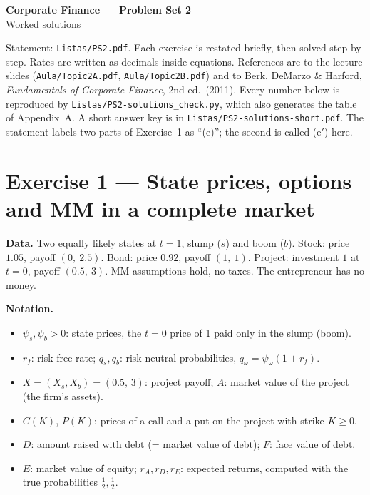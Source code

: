 \documentclass[11pt,a4paper]{article}
\numberwithin{equation}{section}
\newenvironment{notation}{\par\noindent\textbf{Notation.}\begin{itemize}[leftmargin=1.4em]}{\end{itemize}}
\begin{document}
\begin{center}
  {\Large\bfseries Corporate Finance --- Problem Set 2}\\[4pt]
  {\large Worked solutions}
\end{center}

\noindent Statement: \texttt{Listas/PS2.pdf}. Each exercise is restated briefly, then solved
step by step. Rates are written as decimals inside equations. References are to the lecture
slides (\texttt{Aula/Topic2A.pdf}, \texttt{Aula/Topic2B.pdf}) and to Berk, DeMarzo \& Harford,
\emph{Fundamentals of Corporate Finance}, 2nd ed.\ (2011). Every number below is reproduced by
\texttt{Listas/PS2-solutions\_check.py}, which also generates the table of Appendix~A. A short
answer key is in \texttt{Listas/PS2-solutions-short.pdf}. The statement labels two parts of
Exercise~1 as ``(e)''; the second is called (e$'$) here.

\section{Exercise 1 --- State prices, options and MM in a complete market}

\noindent\textbf{Data.} Two equally likely states at $t=1$, slump ($s$) and boom ($b$). Stock: price
$1.05$, payoff $(0,\ 2.5)$. Bond: price $0.92$, payoff $(1,\ 1)$. Project: investment $1$ at $t=0$,
payoff $(0.5,\ 3)$. MM assumptions hold, no taxes. The entrepreneur has no money.

\begin{notation}
  \item $\psi_s,\psi_b>0$: state prices, the $t=0$ price of 1 paid only in the slump (boom).
  \item $r_f$: risk-free rate; $q_s,q_b$: risk-neutral probabilities, $q_\omega=\psi_\omega(1+r_f)$.
  \item $X=(X_s,X_b)=(0.5,\,3)$: project payoff; $A$: market value of the project (the firm's assets).
  \item $C(K)$, $P(K)$: prices of a call and a put on the project with strike $K\ge0$.
  \item $D$: amount raised with debt (= market value of debt); $F$: face value of debt.
  \item $E$: market value of equity; $r_A,r_D,r_E$: expected returns, computed with the true
        probabilities $\tfrac12,\tfrac12$.
\end{notation}
\end{document}
